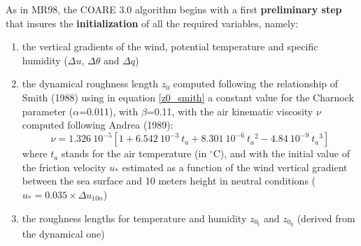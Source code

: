 As in MR98, the COARE 3.0 algorithm begins with a first \textbf{preliminary step} that insures the \textbf{initialization} 
of all the required variables, namely:
\begin{enumerate}

	\item the vertical gradients of the wind, potential temperature and specific humidity ($\Delta u$, $\Delta \theta$ and $\Delta q$)

	\item the dynamical roughness length $z_0$ computed following the relationship of Smith (1988)\nocite{smith1988} 
using in equation \ref{z0_smith} a constant value for the Charnock \nocite{Charnock1955} parameter ($\alpha$=0.011), with $\beta$=0.11,
with the air kinematic viscosity $\nu$ computed following Andrea (1989):
\begin{equation}
	\nu = 1.326~10^{-5} \left[ 1 + 6.542~10^{-3}~t_a + 8.301~10^{-6}~{t_a}^2 - 4.84~10^{-9}~{t_a}^3 \right]
\end{equation}
where $t_a$ stands for the air temperature (in $^{\circ}$C), and with
the initial value of the friction velocity $u_*$ estimated as a function of the wind vertical gradient between the sea surface 
and 10 meters height in neutral conditions ($u_*=0.035\times \Delta u_{10n}$)

	\item the roughness lengths for temperature and humidity $z_{0_t}$ and $z_{0_q}$ (derived from the dynamical one)


\end{enumerate}
